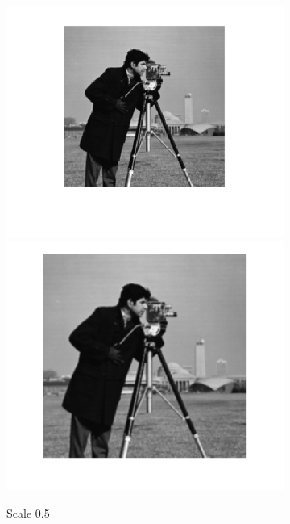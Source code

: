\documentclass{article}
\begin{document}
\begin{figure}[h!]
	\centering
	\begin{subfigure}[t]{0.3\textwidth}
		\centering
		\includegraphics[width=\linewidth]{./output_images/DOWN_anti-alias_bilinear_scale_0_500000.png}
		\includegraphics[width=\linewidth]{./output_images/UP_anti-alias_bilinear_scale_0_500000.png}
		\caption{Scale 0.5}
	\end{subfigure}%
	~
	\begin{subfigure}[t]{0.3\textwidth}

\end{subfigure}
\end{figure}
\end{document}
